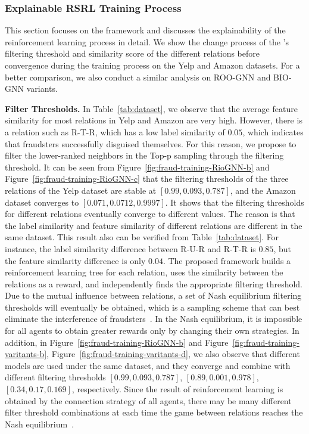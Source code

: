 \subsubsection{Explainable RSRL Training Process}\label{sec:fraud-explainable}
This section focuses on the \RSRL framework and discusses the explainability of the reinforcement learning process in detail.
We show the change process of the \RioGNN's filtering threshold and similarity score of the different relations before convergence during the training process on the Yelp and Amazon datasets.
For a better comparison, we also conduct a similar analysis on ROO-GNN and BIO-GNN variants.


\textbf{Filter Thresholds. }
In Table~\ref{tab:dataset}, we observe that the average feature similarity for most relations in Yelp and Amazon are very high.
However, there is a relation such as R-T-R, which has a low label similarity of $0.05$, which indicates that fraudsters successfully disguised themselves.
For this reason, we propose to filter the lower-ranked neighbors in the Top-p sampling through the filtering threshold.
It can be seen from Figure~\ref{fig:fraud-training-RioGNN-b} and Figure~\ref{fig:fraud-training-RioGNN-c} that the filtering thresholds of the three relations of the Yelp dataset are stable at $[0.99, 0.093, 0.787]$, and the Amazon dataset converges to $[0.071, 0.0712, 0.9997]$.
It shows that the filtering thresholds for different relations eventually converge to different values.
The reason is that the label similarity and feature similarity of different relations are different in the same dataset.
This result also can be verified from Table~\ref{tab:dataset}.
For instance, the label similarity difference between R-U-R and R-T-R is $0.85$, but the feature similarity difference is only $0.04$.
The proposed framework builds a reinforcement learning tree for each relation, uses the similarity between the relations as a reward, and independently finds the appropriate filtering threshold.
Due to the mutual influence between relations, a set of Nash equilibrium filtering thresholds will eventually be obtained, which is a sampling scheme that can best eliminate the interference of fraudsters~\cite{dou2020robust}.
In the Nash equilibrium, it is impossible for all agents to obtain greater rewards only by changing their own strategies.
In addition, in Figure~\ref{fig:fraud-training-RioGNN-b} and Figure~\ref{fig:fraud-training-varitants-b}, Figure~\ref{fig:fraud-training-varitants-d}, we also observe that different models are used under the same dataset, and they converge and combine with different filtering thresholds $[0.99, 0.093, 0.787]$, $[0.89, 0.001, 0.978]$, $[0.34, 0.17, 0.169]$, respectively.
Since the result of reinforcement learning is obtained by the connection strategy of all agents, there may be many different filter threshold combinations at each time the game between relations reaches the Nash equilibrium~\cite{junling1998rlmultinash,pozo2011multinash}.


